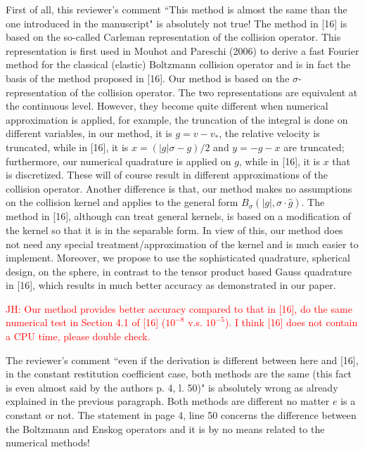 \documentclass[11pt]{article}
\newcommand{\jh}[1]{\textcolor{red}{JH: #1}}
\begin{document}
First of all, this reviewer's comment ``This method is almost the same than the one introduced in the manuscript" is absolutely not true! The method in [16] is based on the so-called Carleman representation of the collision operator. This representation is first used in Mouhot and Pareschi (2006) to derive a fast Fourier method for the classical (elastic) Boltzmann collision operator and is in fact the basis of the method proposed in [16]. Our method is based on the $\sigma$-representation of the collision operator. The two representations are equivalent at the continuous level. However, they become quite different when numerical approximation is applied, for example, the truncation of the integral is done on different variables, in our method, it is $g=v-v_*$, the relative velocity is truncated, while in [16], it is $x=(|g|\sigma-g)/2$ and $y=-g-x$ are truncated; furthermore, our numerical quadrature is applied on $g$, while in [16], it is $x$ that is discretized. These will of course result in different approximations of the collision operator. Another difference is that, our method makes no assumptions on the collision kernel and applies to the general form $B_{\sigma}(|g|,\sigma\cdot \hat{g})$. The method in [16], although can treat general kernels, is based on a modification of the kernel so that it is in the separable form. In view of this, our method does not need any special treatment/approximation of the kernel and is much easier to implement. Moreover, we propose to use the sophisticated quadrature, spherical design, on the sphere, in contrast to the tensor product based Gauss quadrature in [16], which results in much better accuracy as demonstrated in our paper.

\jh{Our method provides better accuracy compared to that in [16], do the same numerical test in Section 4.1 of [16] ($10^{-8}$ v.s. $10^{-5}$). I think [16] does not contain a CPU time, please double check.}

The reviewer's comment ``even if the derivation is different between here and [16], in the constant restitution coefficient case, both methods are the same (this fact is even almost said by the authors p. 4, l. 50)" is absolutely wrong as already explained in the previous paragraph. Both methods are different no matter $e$ is a constant or not. The statement in page 4, line 50 concerns the difference between the Boltzmann and Enskog operators and it is by no means related to the numerical methods!
\end{document}
